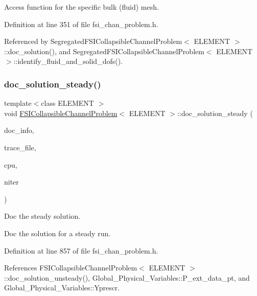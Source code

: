 Access function for the specific bulk (fluid) mesh. 



Definition at line 351 of file fsi\+\_\+chan\+\_\+problem.\+h.



Referenced by Segregated\+F\+S\+I\+Collapsible\+Channel\+Problem$<$ E\+L\+E\+M\+E\+N\+T $>$\+::doc\+\_\+solution(), and Segregated\+F\+S\+I\+Collapsible\+Channel\+Problem$<$ E\+L\+E\+M\+E\+N\+T $>$\+::identify\+\_\+fluid\+\_\+and\+\_\+solid\+\_\+dofs().

\mbox{\label{classFSICollapsibleChannelProblem_a6541733e0d9e8e09bda489d6ce567ecb}} 
\subsubsection{\texorpdfstring{doc\+\_\+solution\+\_\+steady()}{doc\_solution\_steady()}}
{\footnotesize\ttfamily template$<$class E\+L\+E\+M\+E\+NT $>$ \\
void \hyperlink{classFSICollapsibleChannelProblem}{F\+S\+I\+Collapsible\+Channel\+Problem}$<$ E\+L\+E\+M\+E\+NT $>$\+::doc\+\_\+solution\+\_\+steady (\begin{DoxyParamCaption}\item[{Doc\+Info \&}]{doc\+\_\+info,  }\item[{ofstream \&}]{trace\+\_\+file,  }\item[{const double \&}]{cpu,  }\item[{const unsigned \&}]{niter }\end{DoxyParamCaption})\hspace{0.3cm}{\ttfamily [virtual]}}



Doc the steady solution. 

Doc the solution for a steady run. 

Definition at line 857 of file fsi\+\_\+chan\+\_\+problem.\+h.



References F\+S\+I\+Collapsible\+Channel\+Problem$<$ E\+L\+E\+M\+E\+N\+T $>$\+::doc\+\_\+solution\+\_\+unsteady(), Global\+\_\+\+Physical\+\_\+\+Variables\+::\+P\+\_\+ext\+\_\+data\+\_\+pt, and Global\+\_\+\+Physical\+\_\+\+Variables\+::\+Yprescr.



